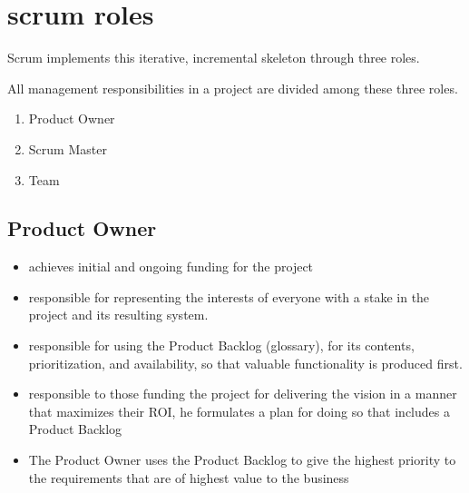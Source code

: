 \section{scrum roles}

Scrum implements this iterative, incremental skeleton through three roles.

All management responsibilities in a project are divided among these three roles.

\begin{enumerate}
  \item Product Owner
  \item Scrum Master
  \item Team
\end{enumerate}


\subsection{Product Owner}

\begin{itemize}
  \item achieves initial and ongoing funding for the project
  \item responsible for representing the interests of everyone with a stake in the project and its resulting system.
  \item responsible for using the Product Backlog (glossary), for its contents, prioritization, and availability, so that valuable functionality is produced first.
  \item responsible to those funding the project for delivering the vision in a manner that maximizes their ROI, he formulates a plan for doing so that includes a Product Backlog
  \item The Product Owner uses the Product Backlog to give the highest priority to the requirements that are of highest value to the business
\end{itemize}


